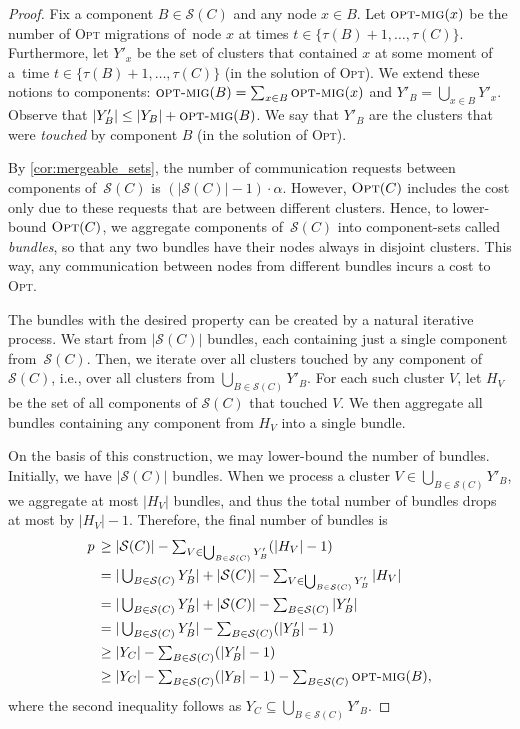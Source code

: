 \documentclass{siamart190516}
\newcommand{\OPT}{\textsc{Opt}\xspace}
\newcommand{\optmig}{\textsc{opt-mig}}
\newcommand{\set}{\mathcal{S}}
\begin{document}
\begin{proof}
Fix a component $B \in \set(C)$ and any node $x \in B$. Let $\optmig(x)$ be the
number of \OPT migrations of~node $x$ at times $t \in \{ \tau(B)+1, \ldots,
\tau(C) \}$. Furthermore, let $Y'_x$ be the set of clusters that
contained $x$ at some moment of a~time $t \in \{ \tau(B)+1, \ldots, \tau(C)
\}$ (in the solution of \OPT). We extend these notions to components:
$\optmig(B) = \sum_{x \in B} \optmig(x)$ and $Y'_B = \bigcup_{x \in B} Y'_x$.
Observe that $|Y'_B| \leq |Y_B| + \optmig(B)$.
We say that $Y'_B$ are the clusters that were \emph{touched} by component $B$ 
(in the solution of \OPT).

By \cref{cor:mergeable_sets}, the number of communication requests between
components of~$\set(C)$ is $(|\set(C)|-1) \cdot \alpha$. However, $\OPT(C)$
includes the cost only due to these requests that are between different clusters.
Hence, to lower-bound $\OPT(C)$, we aggregate components of~$\set(C)$ into
component-sets called \emph{bundles}, so that any two bundles have their nodes
always in disjoint clusters. This way, any communication between nodes from
different bundles incurs a cost to \OPT.

The bundles with the desired property can be created by a natural iterative 
process. We start from $|\set(C)|$ bundles, each containing just a single 
component from~$\set(C)$. Then, we iterate over all clusters touched 
by any component of $\set(C)$, i.e., over all clusters from $\bigcup_{B \in \set(C)} Y'_B$.
For each such cluster $V$, let $H_V$ be the set 
of all components of $\set(C)$ that touched $V$. We then aggregate all bundles 
containing any component from $H_V$ into a single bundle.

On the basis of this construction, we may lower-bound the number of 
bundles. Initially, we have $|\set(C)|$ bundles. When we process a cluster $V \in 
\bigcup_{B \in \set(C)} Y'_B$, we aggregate at most $|H_V|$ bundles, and thus
the total number of bundles drops at most by $|H_V|-1$. Therefore, the final number of bundles 
is 
\begin{align*}
	p \,
	\geq &\; \textstyle |\set(C)| - \sum_{V \in \bigcup_{B \in \set(C)} Y'_B} (|H_V|-1) \\
	= &\; \textstyle |\bigcup_{B \in \set(C)} Y'_B| + \textstyle |\set(C)| - \sum_{V \in \bigcup_{B \in \set(C)} Y'_B} |H_V| \\
	= &\; \textstyle |\bigcup_{B \in \set(C)} Y'_B| + \textstyle |\set(C)| - \sum_{B \in \set(C)} |Y'_B| \\
	= &\; \textstyle |\bigcup_{B \in \set(C)} Y'_B| - \sum_{B \in \set(C)} (|Y'_B| - 1) \\
	\geq &\; \textstyle |Y_C| - \sum_{B \in \set(C)} (|Y'_B| - 1) \\
	\geq &\; \textstyle |Y_C| - \sum_{B \in \set(C)} (|Y_B|-1) - \sum_{B \in \set(C)} \optmig(B),
\end{align*}
where the second inequality follows as $Y_C \subseteq \bigcup_{B \in \set(C)} Y'_B$.


\end{proof}
\end{document}
